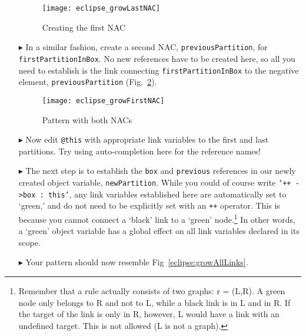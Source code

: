 \begin{itemize}
\begin{figure}[htbp]
\begin{center}
  \texttt{[image: eclipse\_growLastNAC]}
  \caption{Creating the first NAC}
  \label{eclipse:firstNAC}
\end{center}
\end{figure}

\vspace{0.5cm}

\item[$\blacktriangleright$] In a similar fashion, create a second NAC, \texttt{previousPartition}, for \texttt{firstPartitionInBox}. No new references have to
be created here, so all you need to establish is the link connecting \texttt{firstPartitionInBox} to the negative element, \texttt{previousPartition}
(Fig.~\ref{eclipse:growPatt}).

\begin{figure}[htp]
\begin{center}
  \texttt{[image: eclipse\_growFirstNAC]}
  \caption{Pattern with both NACs}
  \label{eclipse:growPatt}
\end{center}
\end{figure}

\item[$\blacktriangleright$] Now edit \texttt{@this} with appropriate link variables to the first and last partitions. Try using auto-completion here for the
reference names!

\newpage

\item[$\blacktriangleright$] The next step is to establish the \texttt{box} and \texttt{previous} references in our newly created object variable,
\texttt{newPartition}. While you could of course write \texttt{`++ ->box : this'}, any link variables established here are automatically set to `green,' and do
not need to be explicitly set with an \texttt{++} operator. This is because you cannot connect a `black' link to a `green' node.\footnote{Remember that a rule
actually consists of two graphs: r = (L,R). A green node only belongs to R and not to L, while a black link is in L and in R. If the target of the link is only
in R, however, L would have a link with an undefined target. This is not allowed (L is not a graph).} In other words, a `green' object variable has a global
effect on all link variables declared in its scope.

\item[$\blacktriangleright$] Your pattern should now resemble Fig~\ref{eclipse:growAllLinks}. 


\end{itemize}
